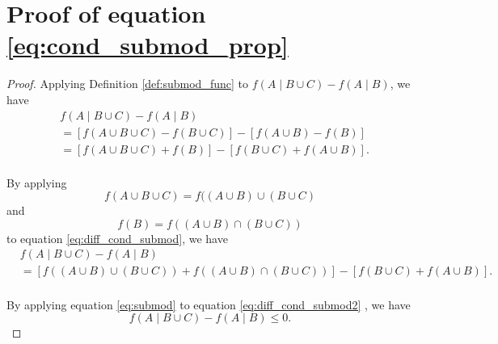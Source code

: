 \section{Proof of equation \ref{eq:cond_submod_prop}} 
\label{app:cond_submod_prop}
\begin{proof}

Applying Definition \ref{def:submod_func} to $ f(A \mid B \cup C) - f(A \mid B) $, we have
\begin{equation}
\label{eq:diff_cond_submod}
\begin{aligned}
& f(A \mid B \cup C) - f(A \mid B) \\
& = \left[ f( A \cup B \cup C ) - f ( B \cup C ) \right]
- \left[ f ( A \cup B ) - f ( B )  \right] \\
& = \left[ f( A \cup B \cup C ) + f ( B ) \right] 
- \left[ f ( B \cup C ) + f ( A \cup B ) \right]. \\
\end{aligned}
\end{equation}

By applying
\begin{equation}
f( A \cup B \cup C ) = f( (A \cup B) \cup (B \cup C)
\end{equation}
and
\begin{equation}
f ( B ) = f ( (A \cup B) \cap (B \cup C) )
\end{equation}
to equation \eqref{eq:diff_cond_submod}, we have
\begin{equation}
\label{eq:diff_cond_submod2}
\begin{aligned}
& f(A \mid B \cup C) - f(A \mid B) \\
& = \left[ f( (A \cup B) \cup (B \cup C) ) + f ( (A \cup B) \cap (B \cup C) )  \right]
- \left[ f ( B \cup C ) + f ( A \cup B ) \right]. \\
\end{aligned}
\end{equation}

By applying equation \eqref{eq:submod} to equation \eqref{eq:diff_cond_submod2} , we have
\begin{equation}
f(A \mid B \cup C) - f(A \mid B) \leq 0.
\end{equation}

\end{proof}

